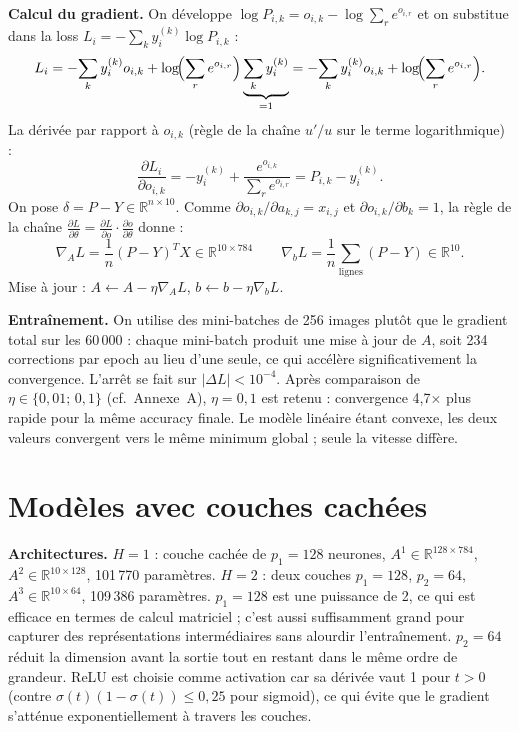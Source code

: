\documentclass[10pt,a4paper]{article}
\begin{document}
\textbf{Calcul du gradient.}
On développe $\log P_{i,k}=o_{i,k}-\log\sum_r e^{o_{i,r}}$
et on substitue dans la loss $L_i=-\sum_k y_i^{(k)}\log P_{i,k}$ :
\[
L_i
= -\!\sum_k y_i^{(k)}o_{i,k}
+ \log\!\Bigl(\sum_r e^{o_{i,r}}\Bigr)\underbrace{\sum_k y_i^{(k)}}_{=1}
= -\!\sum_k y_i^{(k)}o_{i,k} + \log\!\Bigl(\sum_r e^{o_{i,r}}\Bigr).
\]
La dérivée par rapport à $o_{i,k}$ (règle de la chaîne $u'/u$ sur le terme logarithmique) :
\[
\frac{\partial L_i}{\partial o_{i,k}}
= -y_i^{(k)}
  + \frac{e^{o_{i,k}}}{\sum_r e^{o_{i,r}}}
= P_{i,k}-y_i^{(k)}.
\]
On pose $\delta=P-Y\in\mathbb{R}^{n\times10}$.
Comme $\partial o_{i,k}/\partial a_{k,j}=x_{i,j}$ et $\partial o_{i,k}/\partial b_k=1$,
la règle de la chaîne
$\tfrac{\partial L}{\partial \theta}=\tfrac{\partial L}{\partial o}\cdot\tfrac{\partial o}{\partial \theta}$
donne :
\[
\boxed{\nabla_A L = \frac{1}{n}(P-Y)^T X \in \mathbb{R}^{10\times784}}
\qquad
\boxed{\nabla_b L = \frac{1}{n}\sum_{\text{lignes}}(P-Y)\in\mathbb{R}^{10}.}
\]
Mise à jour : $A\leftarrow A-\eta\nabla_A L$, $b\leftarrow b-\eta\nabla_b L$.

\textbf{Entraînement.}
On utilise des mini-batches de 256 images plutôt que le gradient total
sur les 60\,000 : chaque mini-batch produit une mise à jour de $A$,
soit 234 corrections par epoch au lieu d'une seule,
ce qui accélère significativement la convergence.
L'arrêt se fait sur $|\Delta L|<10^{-4}$.
Après comparaison de $\eta\in\{0{,}01;\,0{,}1\}$ (cf.~Annexe~A),
$\eta=0{,}1$ est retenu : convergence 4{,}7$\times$ plus rapide
pour la même accuracy finale. Le modèle linéaire étant convexe,
les deux valeurs convergent vers le même minimum global ;
seule la vitesse diffère.

\section{Modèles avec couches cachées}

\textbf{Architectures.}
$H=1$ : couche cachée de $p_1=128$ neurones,
$A^1\in\mathbb{R}^{128\times784}$, $A^2\in\mathbb{R}^{10\times128}$, 101\,770 paramètres.
$H=2$ : deux couches $p_1=128$, $p_2=64$,
$A^3\in\mathbb{R}^{10\times64}$, 109\,386 paramètres.
$p_1=128$ est une puissance de 2, ce qui est efficace en termes de calcul matriciel ;
c'est aussi suffisamment grand pour capturer des représentations intermédiaires
sans alourdir l'entraînement.
$p_2=64$ réduit la dimension avant la sortie tout en restant dans le même ordre de grandeur.
ReLU est choisie comme activation car sa dérivée vaut 1 pour $t>0$
(contre $\sigma(t)(1-\sigma(t))\leq0{,}25$ pour sigmoid),
ce qui évite que le gradient s'atténue exponentiellement à travers les couches.
\end{document}
